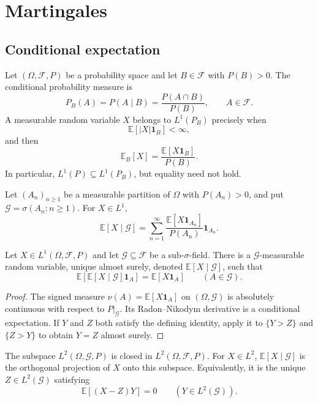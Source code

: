 \section{Martingales}

\subsection{Conditional expectation}

\begin{de}
Let $(\Omega,\mathcal F,P)$ be a probability space and let $B\in\mathcal F$
with $P(B)>0$. The conditional probability measure is
\[
P_B(A)=P(A\mid B)=\frac{P(A\cap B)}{P(B)},
\qquad A\in\mathcal F.
\]
A measurable random variable $X$ belongs to $L^1(P_B)$ precisely when
\[
\mathbb E[|X|\mathbf1_B]<\infty,
\]
and then
\[
\mathbb E_B[X]=\frac{\mathbb E[X\mathbf1_B]}{P(B)}.
\]
In particular, $L^1(P)\subseteq L^1(P_B)$, but equality need not hold.
\end{de}

\begin{de}
Let $(A_n)_{n\geq1}$ be a measurable partition of $\Omega$ with
$P(A_n)>0$, and put $\mathcal G=\sigma(A_n:n\geq1)$. For $X\in L^1$,
\[
\mathbb E[X\mid\mathcal G]
 =\sum_{n=1}^{\infty}
   \frac{\mathbb E[X\mathbf1_{A_n}]}{P(A_n)}\mathbf1_{A_n}.
\]
\end{de}

\begin{thm}
Let $X\in L^1(\Omega,\mathcal F,P)$ and let
$\mathcal G\subseteq\mathcal F$ be a sub-$\sigma$-field. There is a
$\mathcal G$-measurable random variable, unique almost surely, denoted
$\mathbb E[X\mid\mathcal G]$, such that
\[
\mathbb E[\mathbb E[X\mid\mathcal G]\mathbf1_A]
 =\mathbb E[X\mathbf1_A]
\qquad(A\in\mathcal G).
\]
\end{thm}

\begin{proof}
The signed measure
$\nu(A)=\mathbb E[X\mathbf1_A]$ on $(\Omega,\mathcal G)$ is absolutely
continuous with respect to $P|_{\mathcal G}$. Its Radon--Nikodym derivative
is a conditional expectation. If $Y$ and $Z$ both satisfy the defining
identity, apply it to $\{Y>Z\}$ and $\{Z>Y\}$ to obtain $Y=Z$ almost surely.
\end{proof}

\begin{prop}
The subspace $L^2(\Omega,\mathcal G,P)$ is closed in
$L^2(\Omega,\mathcal F,P)$. For $X\in L^2$,
$\mathbb E[X\mid\mathcal G]$ is the orthogonal projection of $X$ onto this
subspace. Equivalently, it is the unique $Z\in L^2(\mathcal G)$ satisfying
\[
\mathbb E[(X-Z)Y]=0
\qquad(Y\in L^2(\mathcal G)).
\]
\end{prop}

